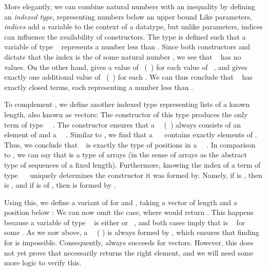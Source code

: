 More elegantly, we can combine natural numbers with an inequality by defining an \emph{indexed type}, representing numbers below an upper bound
Like parameters, \emph{indices} add a variable to the context of a datatype, but unlike parameters, indices can influence the availability of constructors. The type  is defined such that a variable of type \  represents a number less than . Since both constructors  and  dictate that the index is the  of some natural number , we see that \  has no values. On the other hand,  gives a value of \ (\ ) for each value of \ , and  gives exactly one additional value of \ (\ ) for each . We can thus conclude that \  has exactly  closed terms, each representing a number less than .

To complement , we define another indexed type representing lists of a known length, also known as vectors:
The \AIC{[]} constructor of this type produces the only term of type \ \ . The  constructor ensures that a \ \ (\ ) always consists of an element of  and a \ \ . Similar to , we find that a \ \  contains exactly  elements of . Thus, we conclude that \  is exactly the type of positions in a \ \ . In comparison to , we can say that  is a type of arrays (in the sense of arrays as the abstract type of sequences of a fixed length). Furthermore, knowing the index of a term  of type \ \  uniquely determines the constructor it was formed by. Namely, if  is , then  is \AIC{[]}, and if  is  of , then  is formed by . 

Using this, we define a variant of  for  and , taking a vector of length  and a position below :
We can now omit the \AIC{[]} case, where  would return . This happens because a variable of type \  is either  or \ , and both cases imply that  is \  for some . As we saw above, a \ \ ( ) is always formed by , which ensures that finding \AIC{[]} for  is impossible. Consequently,  always succeeds for vectors. However, this does not yet prove that  necessarily returns the right element, and we will need some more logic to verify this.

